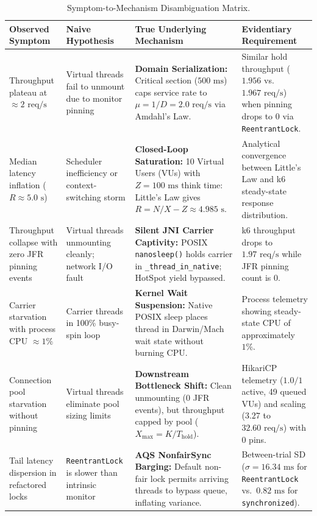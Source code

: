 \begin{table}[htbp]
  \centering
  \small
  \caption{Symptom-to-Mechanism Disambiguation Matrix.}
  \label{tab:symptom-disambiguation}
  \begin{tabularx}{\textwidth}{@{}>{\raggedright\arraybackslash}p{}>{\raggedright\arraybackslash}p{}>{\raggedright\arraybackslash}X>{\raggedright\arraybackslash}p{}@{}}
    \toprule
    \textbf{Observed Symptom} & \textbf{Naive Hypothesis} & \textbf{True Underlying Mechanism} & \textbf{Evidentiary Requirement} \\
    \midrule
    Throughput plateau at $\approx 2\text{ req/s}$ & Virtual threads fail to unmount due to monitor pinning & \textbf{Domain Serialization:} Critical section ($500\text{ ms}$) caps service rate to $\mu = 1/D = 2.0\text{ req/s}$ via Amdahl's Law. & Similar hold throughput ($1.956$ vs.\ $1.967\text{ req/s}$) when pinning drops to 0 via \texttt{ReentrantLock}. \\
    \addlinespace
    Median latency inflation ($R \approx 5.0\text{ s}$) & Scheduler inefficiency or context-switching storm & \textbf{Closed-Loop Saturation:} 10 Virtual Users (VUs) with $Z = 100\text{ ms}$ think time: Little's Law gives $R = N/X - Z \approx 4.985\text{ s}$. & Analytical convergence between Little's Law and k6 steady-state response distribution. \\
    \addlinespace
    Throughput collapse with zero JFR pinning events & Virtual threads unmounting cleanly; network I/O fault & \textbf{Silent JNI Carrier Captivity:} POSIX \texttt{nanosleep()} holds carrier in \texttt{\_thread\_in\_native}; HotSpot yield bypassed. & k6 throughput drops to $1.97\text{ req/s}$ while JFR pinning count is 0. \\
    \addlinespace
    Carrier starvation with process CPU $\approx 1\%$ & Carrier threads in 100\% busy-spin loop & \textbf{Kernel Wait Suspension:} Native POSIX sleep places thread in Darwin/Mach wait state without burning CPU. & Process telemetry showing steady-state CPU of approximately $1\%$. \\
    \addlinespace
    Connection pool starvation without pinning & Virtual threads eliminate pool sizing limits & \textbf{Downstream Bottleneck Shift:} Clean unmounting (0 JFR events), but throughput capped by pool ($X_{\text{max}} = K / T_{\text{hold}}$). & HikariCP telemetry ($1.0/1$ active, 49 queued VUs) and scaling ($3.27$ to $32.60\text{ req/s}$) with 0 pins. \\
    \addlinespace
    Tail latency dispersion in refactored locks & \texttt{ReentrantLock} is slower than intrinsic monitor & \textbf{AQS NonfairSync Barging:} Default non-fair lock permits arriving threads to bypass queue, inflating variance. & Between-trial SD ($\sigma = 16.34\text{ ms}$ for \texttt{ReentrantLock} vs.\ $0.82\text{ ms}$ for \texttt{synchronized}). \\
    \bottomrule
  \end{tabularx}
\end{table}

